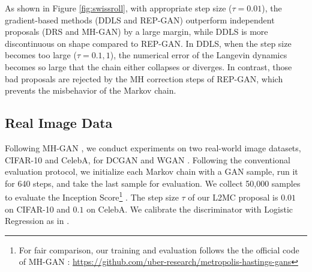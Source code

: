 \documentclass{article} %
\newcommand{\<}{\left\langle}
\renewcommand{\>}{\right\rangle}
\begin{document}
As shown in Figure \ref{fig:swissroll}, with appropriate step size ($\tau=0.01$), the gradient-based methods (DDLS and REP-GAN) outperform independent proposals (DRS and MH-GAN) by a large margin, while DDLS is more discontinuous on shape compared to REP-GAN. In DDLS, when the step size becomes too large ($\tau=0.1,1$), the numerical error of the Langevin dynamics becomes so large that the chain either collapses or diverges. In contrast, those bad proposals are rejected by the MH correction steps of REP-GAN, which prevents the misbehavior of the Markov chain.

\subsection{Real Image Data}

Following MH-GAN \citep{turner2019metropolis}, we conduct experiments on two real-world image datasets, CIFAR-10 and CelebA, for DCGAN \citep{radford2015unsupervised} and WGAN \citep{arjovsky2017wasserstein}. 
Following the conventional evaluation protocol, we initialize each Markov chain with a GAN sample, run it for 640 steps, and take the last sample for evaluation. We collect 50,000 samples to evaluate the Inception Score\footnote{For fair comparison, our training and evaluation follows the the official code of MH-GAN \citep{turner2019metropolis}: \url{https://github.com/uber-research/metropolis-hastings-gans}} \citep{salimans2016improved}. 
The step size $\tau$ of our L2MC proposal is $0.01$ on CIFAR-10 and $0.1$ on CelebA. We calibrate the discriminator with Logistic Regression as in \cite{turner2019metropolis}. 


\end{document}
